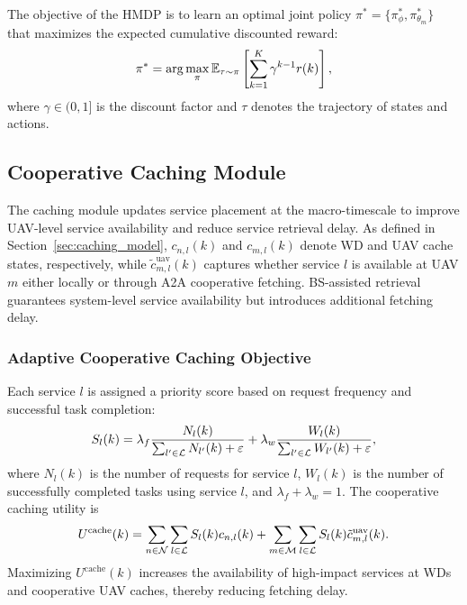 \documentclass[journal]{IEEEtran}
\begin{document}
The objective of the HMDP is to learn an optimal joint policy $\pi^* = \{\pi_\phi^*, \pi_{\theta_m}^*\}$ that maximizes the expected cumulative discounted reward:
\begin{equation}
\small
\pi^* = \arg\max_{\pi} \mathbb{E}_{\tau \sim \pi} \left[ \sum_{k=1}^{K} \gamma^{k-1} r(k) \right],
\end{equation}
where $\gamma \in (0,1]$ is the discount factor and $\tau$ denotes the trajectory of states and actions.

\subsection{Cooperative Caching Module}

The caching module updates service placement at the macro-timescale to improve UAV-level service availability and reduce service retrieval delay. As defined in Section~\ref{sec:caching_model}, $c_{n,l}(k)$ and $c_{m,l}(k)$ denote WD and UAV cache states, respectively, while $\tilde{c}_{m,l}^{\mathrm{uav}}(k)$ captures whether service $l$ is available at UAV $m$ either locally or through A2A cooperative fetching. BS-assisted retrieval guarantees system-level service availability but introduces additional fetching delay.

\subsubsection{Adaptive Cooperative Caching Objective}

Each service $l$ is assigned a priority score based on request frequency and successful task completion:
\begin{equation}
\small
S_l(k)=
\lambda_f
\frac{N_l(k)}{\sum_{l'\in\mathcal{L}}N_{l'}(k)+\varepsilon}
+
\lambda_w
\frac{W_l(k)}{\sum_{l'\in\mathcal{L}}W_{l'}(k)+\varepsilon},
\label{eq:service_priority}
\end{equation}
where $N_l(k)$ is the number of requests for service $l$, $W_l(k)$ is the number of successfully completed tasks using service $l$, and $\lambda_f+\lambda_w=1$. The cooperative caching utility is
\begin{equation}
\small
U^{\mathrm{cache}}(k)
=
\sum_{n\in\mathcal{N}}\sum_{l\in\mathcal{L}} S_l(k)c_{n,l}(k)
+
\sum_{m\in\mathcal{M}}\sum_{l\in\mathcal{L}} 
S_l(k)\tilde{c}_{m,l}^{\mathrm{uav}}(k).
\label{eq:cache_utility}
\end{equation}
Maximizing $U^{\mathrm{cache}}(k)$ increases the availability of high-impact services at WDs and cooperative UAV caches, thereby reducing fetching delay.
\end{document}
